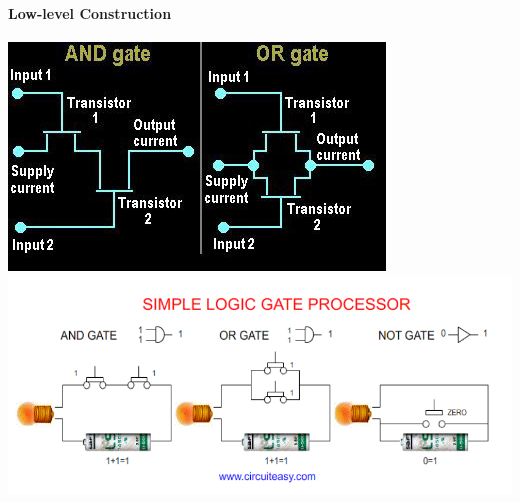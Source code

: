 \documentclass[12 pt]{article}
\begin{document}
		\paragraph{Low-level Construction}
		\includegraphics[scale=0.7]{aog}
		\\ \includegraphics[scale=0.7]{lc}
\end{document}
